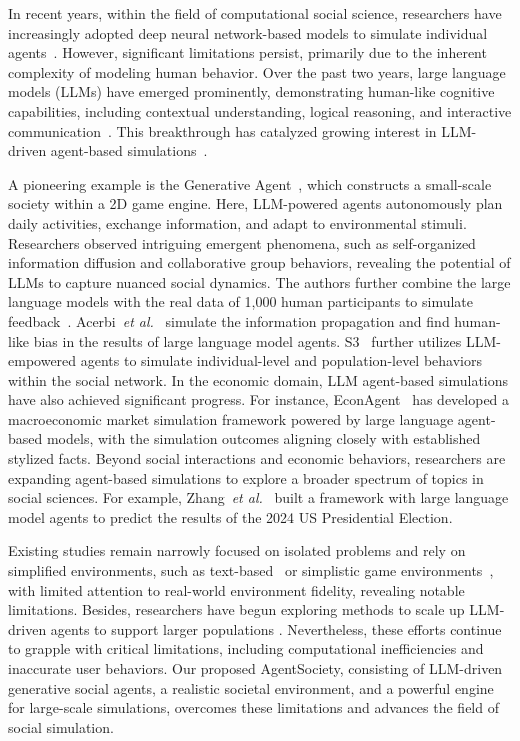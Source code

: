 In recent years, within the field of computational social science, researchers have increasingly adopted deep neural network-based models to simulate individual agents~\cite{van2017deep,kavak2018big}. However, significant limitations persist, primarily due to the inherent complexity of modeling human behavior.  Over the past two years, large language models (LLMs) have emerged prominently, demonstrating human-like cognitive capabilities, including contextual understanding, logical reasoning, and interactive communication~\cite{orru2023human,lampinen2024language}. This breakthrough has catalyzed growing interest in LLM-driven agent-based simulations~\cite{gao2024large}.  

A pioneering example is the Generative Agent~\cite{park2023generative}, which constructs a small-scale society within a 2D game engine. Here, LLM-powered agents autonomously plan daily activities, exchange information, and adapt to environmental stimuli. Researchers observed intriguing emergent phenomena, such as self-organized information diffusion and collaborative group behaviors, revealing the potential of LLMs to capture nuanced social dynamics. The authors further combine the large language models with the real data of 1,000 human participants to simulate feedback~\cite{park2024generative}. Acerbi~\textit{et al.}~\cite{acerbi2023large} simulate the information propagation and find human-like bias in the results of large language model agents. 
 S3~\cite{gao2023s} further utilizes LLM-empowered agents to simulate individual-level and population-level behaviors within the social network. In the economic domain, LLM agent-based simulations have also achieved significant progress. For instance, EconAgent~\cite{li2024econagent} has developed a macroeconomic market simulation framework powered by large language agent-based models, with the simulation outcomes aligning closely with established stylized facts. 
Beyond social interactions and economic behaviors, researchers are expanding agent-based simulations to explore a broader spectrum of topics in social sciences. For example, Zhang~\textit{et al.}~\cite{zhang2024electionsim} built a framework with large language model agents to predict the results of the 2024 US Presidential Election.

Existing studies remain narrowly focused on isolated problems and rely on simplified environments, such as text-based~\cite{aher2023using} or simplistic game environments~\cite{park2023generative}, with limited attention to real-world environment fidelity, revealing notable limitations. Besides, researchers have begun exploring methods to scale up LLM-driven agents to support larger populations \cite{tang2024gensim,wang2024user,yang2024oasis}. Nevertheless, these efforts continue to grapple with critical limitations, including computational inefficiencies and inaccurate user behaviors. Our proposed AgentSociety, consisting of LLM-driven generative social agents, a realistic societal environment, and a powerful engine for large-scale simulations, overcomes these limitations and advances the field of social simulation.


